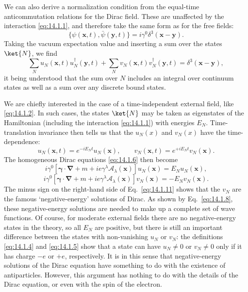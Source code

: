 We can also derive a normalization condition from the equal-time
anticommutation relations for the Dirac field. These are unaffected by the
interaction \eqref{eq:14.1.1}, and therefore take the same form as for the free
fields:
\begin{equation}
  \{\psi(\mathbf x,t),\bar\psi(\mathbf y,t)\}
  =i\gamma^0\delta^3(\mathbf x-\mathbf y).
  \tag{14.1.7}\label{eq:14.1.7}
\end{equation}
Taking the vacuum expectation value and inserting a sum over the states
$\ket{N}$, we find
\begin{equation}
  \sum_Nu_N(\mathbf x,t)u_N^\dagger(\mathbf y,t)
  +\sum_Nv_N(\mathbf x,t)v_N^\dagger(\mathbf y,t)
  =\delta^3(\mathbf x-\mathbf y),
  \tag{14.1.8}\label{eq:14.1.8}
\end{equation}
it being understood that the sum over $N$ includes an integral over continuum
states as well as a sum over any discrete bound states.

We are chiefly interested in the case of a time-independent external field,
like \eqref{eq:14.1.2}. In such cases, the states $\ket{N}$ may be taken as
eigenstates of the Hamiltonian (including the interaction \eqref{eq:14.1.1})
with energies $E_N$. Time-translation invariance then tells us that the
$u_N(x)$ and $v_N(x)$ have the time-dependence:
\begin{equation}
  u_N(\mathbf x,t)=e^{-iE_Nt}u_N(\mathbf x),\qquad
  v_N(\mathbf x,t)=e^{+iE_Nt}v_N(\mathbf x).
  \tag{14.1.9}\label{eq:14.1.9}
\end{equation}
The homogeneous Dirac equations \eqref{eq:14.1.6} then become
\begin{equation}
  i\gamma^0\left[\boldsymbol\gamma\cdot\boldsymbol\nabla+m
  +ie\gamma^\lambda\mathcal A_\lambda(\mathbf x)\right]u_N(\mathbf x)
  =E_Nu_N(\mathbf x),
  \tag{14.1.10}\label{eq:14.1.10}
\end{equation}
\begin{equation}
  i\gamma^0\left[\boldsymbol\gamma\cdot\boldsymbol\nabla+m
  +ie\gamma^\lambda\mathcal A_\lambda(\mathbf x)\right]v_N(\mathbf x)
  =-E_Nv_N(\mathbf x).
  \tag{14.1.11}\label{eq:14.1.11}
\end{equation}
The minus sign on the right-hand side of Eq.~\eqref{eq:14.1.11} shows that the
$v_N$ are the famous `negative-energy' solutions of Dirac. As shown by
Eq.~\eqref{eq:14.1.8}, these negative-energy solutions are needed to make up a
complete set of wave functions. Of course, for moderate external fields there
are no negative-energy states in the theory, so all $E_N$ are positive, but
there is still an important difference between the states with non-vanishing
$u_N$ or $v_N$: the definitions \eqref{eq:14.1.4} and \eqref{eq:14.1.5} show
that a state can have $u_N\ne0$ or $v_N\ne0$ only if it has charge $-e$ or
$+e$, respectively. It is in this sense that negative-energy solutions of the
Dirac equation have something to do with the existence of antiparticles.
However, this argument has nothing to do with the details of the Dirac
equation, or even with the spin of the electron.

